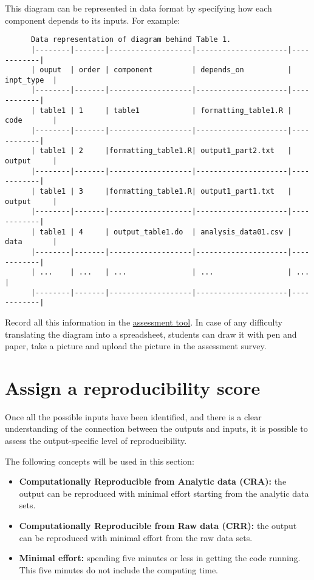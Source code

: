 \documentclass[]{book}
\begin{document}
This diagram can be represented in data format by specifying how each component depends to its inputs. For example:

\begin{verbatim}
      Data representation of diagram behind Table 1.
      |--------|-------|-------------------|---------------------|------------|
      | ouput  | order | component         | depends_on          | inpt_type  |
      |--------|-------|-------------------|---------------------|------------|
      | table1 | 1     | table1            | formatting_table1.R | code       |
      |--------|-------|-------------------|---------------------|------------|
      | table1 | 2     |formatting_table1.R| output1_part2.txt   | output     |
      |--------|-------|-------------------|---------------------|------------|
      | table1 | 3     |formatting_table1.R| output1_part1.txt   | output     |
      |--------|-------|-------------------|---------------------|------------|
      | table1 | 4     | output_table1.do  | analysis_data01.csv | data       |
      |--------|-------|-------------------|---------------------|------------|
      | ...    | ...   | ...               | ...                 | ...        |
      |--------|-------|-------------------|---------------------|------------|
\end{verbatim}

Record all this information in the \href{https://docs.google.com/spreadsheets/d/1LUIdVFH0OfR70C7z07TYeE-uWzKI_JIeWUMaYhqEKK0/edit\#gid=1384504774\&range=A1}{assessment tool}.
In case of any difficulty translating the diagram into a spreadsheet, students can draw it with pen and paper, take a picture and upload the picture in the assessment survey.

\hypertarget{score}{%
\section{Assign a reproducibility score}\label{score}}

Once all the possible inputs have been identified, and there is a clear understanding of the connection between the outputs and inputs, it is possible to assess the output-specific level of reproducibility.

The following concepts will be used in this section:

\begin{itemize}
\item
  \textbf{Computationally Reproducible from Analytic data (CRA):} the output can be reproduced with minimal effort starting from the analytic data sets.
\item
  \textbf{Computationally Reproducible from Raw data (CRR):} the output can be reproduced with minimal effort from the raw data sets.
\item
  \textbf{Minimal effort:} spending five minutes or less in getting the code running. This five minutes do not include the computing time.
\end{itemize}
\end{document}

